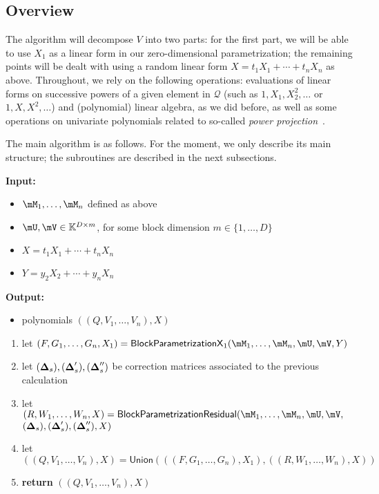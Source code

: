 \documentclass[12pt]{article}
\newcommand{\mat}[1]{\bm{\MakeUppercase{#1}}} %
\newcommand{\mainalgoname}{\mathsf{ BlockParametrization}}
\newcommand{\lf}{X}
\newcommand{\mf}{Y}
\newcommand{\residueI}{\mathscr{Q}}
\newcommand{\sqfree}{Q}
\begin{document}

\subsection{Overview}

The algorithm will decompose $V$ into two parts: for the first part,
we will be able to use $X_1$ as a linear form in our zero-dimensional
parametrization; the remaining points will be dealt with using a
random linear form $\lf=t_1 X_1 + \cdots + t_n X_n$ as
above. Throughout, we rely on the following operations: evaluations of
linear forms on successive powers of a given element in $\residueI$
(such as $1,X_1,X_2^2,\dots$ or $1,\lf,\lf^2,\dots$) and (polynomial)
linear algebra, as we did before, as well as some operations on
univariate polynomials related to so-called {\em power
  projection}~\cite{Shoup94,Shoup99}.

The main algorithm is as follows. For the moment, we only describe its
main structure; the subroutines are described in the next subsections.

\begin{algorithm}[H]
  \caption{$\mathsf{BlockParametrizationWithSplitting}(\mM_1,\dots,\mM_n,\mU,\mV,\lf,\mf$)}
          {\bf Input:} \vspace{-0.5em}
	  \begin{itemize}
	  \item $\mM_1,\dots,\mM_n$ defined as above
	  \item  $\mU,\mV \in \mathbb{K}^{D \times m}$, for some block dimension  $m \in \{1,\dots,D\}$
          \item $\lf =t_1 X_1 + \cdots + t_n X_n$
          \item $\mf =y_2 X_2 + \cdots + y_n X_n$
	  \end{itemize}
	{\bf Output:}  \vspace{-0.5em}
	\begin{itemize}
		\item polynomials $((\sqfree,V_1,\dots,V_n),\lf)$
	\end{itemize}
	\begin{enumerate}
		\item let $(F,G_1,\dots,G_n,X_1)=\mathsf{BlockParametrizationX}_1(\mM_1,\dots,\mM_n,\mU,\mV,\mf)$
                \item let $(\mat{\Delta}_s),(\mat{\Delta}'_s),(\mat{\Delta}''_s)$ be correction matrices associated
                  to the previous calculation
		\item let $(R,W_1,\dots,W_n,\lf)=\mainalgoname{\sf Residual}(\mM_1,\dots,\mM_n,\mU,\mV,$ \\
      \phantom{bla} \hfill $(\mat{\Delta}_s),(\mat{\Delta}'_s),(\mat{\Delta}''_s),\lf)$
		\item let $((\sqfree,V_1,\dots,V_n),\lf)=\mathsf{Union}(((F,G_1,\dots,G_n),X_1), ((R,W_1,\dots,W_n),\lf))$
		\item \textbf{return} $((\sqfree,V_1,\dots,V_n),\lf)$
	\end{enumerate}
\end{algorithm}
\end{document}
